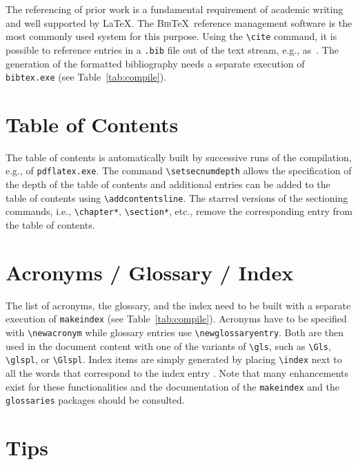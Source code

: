 The referencing of prior work is a fundamental requirement of academic writing and well supported by \LaTeX.
The \textsc{Bib}\TeX\ reference management software is the most commonly used system for this purpose.
Using the \verb|\cite| command, it is possible to reference entries in a \verb|.bib| file out of the text stream, e.g., as~\cite{Turing1936}.
The generation of the formatted bibliography needs a separate execution of \verb|bibtex.exe| (see Table~\ref{tab:compile}).

\section{Table of Contents}

The table of contents is automatically built by successive runs of the compilation, e.g., of \verb|pdflatex.exe|.
The command \verb|\setsecnumdepth| allows the specification of the depth of the table of contents and additional entries can be added to the table of contents using \verb|\addcontentsline|.
The starred versions of the sectioning commands, i.e., \verb|\chapter*|, \verb|\section*|, etc., remove the corresponding entry from the table of contents.

\section{Acronyms / Glossary / Index}

The list of acronyms, the glossary, and the index need to be built with a separate execution of \verb|makeindex| (see Table~\ref{tab:compile}).
Acronyms have to be specified with \verb|\newacronym| while glossary entries use \verb|\newglossaryentry|.
Both are then used in the document content with one of the variants of \verb|\gls|, such as \verb|\Gls|, \verb|\glspl|, or \verb|\Glspl|.
Index items are simply generated by placing \verb|\index| next to all the words that correspond to the index entry .
Note that many enhancements exist for these functionalities and the documentation of the \verb|makeindex| and the \verb|glossaries| packages should be consulted.

\section{Tips}

